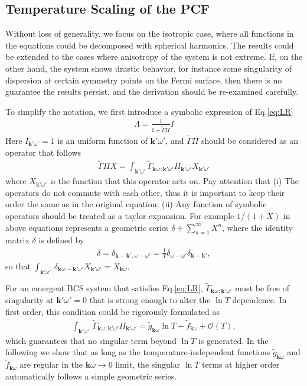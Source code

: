 \documentclass[%
 reprint,
superscriptaddress,
 amsmath,amssymb,
 aps,
prx,
]{revtex4-2}
\newcommand{\bk}{\mathbf{k}}
\newcommand{\Gammapp}{\tilde{\Gamma}}
\newcommand{\pcf}{\Lambda} %
\begin{document}
\begin{appendices}
\subsection{Temperature Scaling of the PCF}
Without loss of generality, we focus on the isotropic case, where all functions in the equations could be decomposed with spherical harmonics.
The results could be extended to the cases where anisotropy of the system is not
extreme.
If, on the other hand, the system shows drastic behavior, for instance some
singularity of dispersion at certain symmetry points on the Fermi surface, then
there is no guarantee the results persist, and the derivation should be re-examined carefully. 


 To simplify the notation, we first introduce a symbolic expression of Eq.\eqref{eq:LR}
\begin{gather}
\label{eq:R_symbol}
\pcf = \frac{1}{1+\Gammapp \Pi}I
\end{gather}
Here $I_{\bk'\omega'} = 1$ is an uniform function of ${\bk'\omega'}$, and $\Gammapp \Pi$ should be considered as an operator that follows
\begin{gather}
	\Gammapp \Pi X = \int_{\bk' \omega'} \Gammapp_{\bk^{}\omega^{};\bk'\omega'} \Pi_{\bk'\omega'} X_{\bk'\omega'}
\end{gather}
 where $X_{\bk'\omega'}$ is the function that this operator acts on. Pay attention that (i)
 The operators do not commute with each other, thus it is important to keep
 their order the same as in the original equation; (ii) Any function of symbolic
 operators should be treated as a taylor expansion.
 For example $1/(1+X)$ in
 above equations represents a geometric series
 $\delta+\sum\limits_{n=1}^{\infty}X^n$, where the identity matrix $\delta$ is defined by 
\begin{gather}
	\delta = \delta_{\bk^{}-\bk',\omega^{}-\omega'} = \frac{1}{T} \delta_{\omega^{}-\omega'}\delta_{\bk^{}-\bk'},
\end{gather}
so that $\int_{\bk'\omega'}\, \delta_{\bk^{}\omega^{}-{\bk'\omega'}}X_{\bk'\omega'} = X_{\bk\omega}$.


For an emergent BCS system that satisfies Eq.\eqref{eq:LR}, $\Gammapp_{\bk^{}\omega^{};\bk'\omega'}$ must be free of
singularity at $\bk'\omega'=0$ that is strong enough to alter the $\ln T$ dependence.
In first order, this condition could be rigorously formulated as
\begin{gather}
\label{eq:oneloop}
	\int_{\bk'\omega'} \, \Gammapp_{\bk^{}\omega^{};{\bk'\omega'}}\Pi_{\bk'\omega'}=\tilde{g}_{\bk\omega} \ln T + \tilde{f}_{\bk\omega} + \mathcal O(T),
\end{gather} 
which guarantees that no singular term beyond $\ln T$ is generated.
In the following we show that as long as the temperature-independent functions $\tilde{g}_{\bk\omega}$ and $\tilde{f}_{\bk\omega}$ are regular in the $\bk\omega\to 0$ limit,
the singular $\ln T$ terms at higher order automatically follows a
simple geometric series.


\end{appendices}
\end{document}
